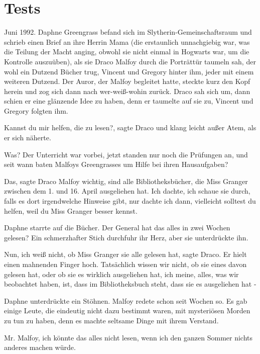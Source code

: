 \chapter{Tests}

Juni 1992. Daphne Greengrass befand sich im Slytherin-Gemeinschaftsraum und
schrieb einen Brief an ihre Herrin Mama (die erstaunlich unnachgiebig war, was
die Teilung der Macht anging, obwohl sie nicht einmal in Hogwarts war, um die
Kontrolle auszuüben), als sie Draco Malfoy durch die Porträttür taumeln sah, der
wohl ein Dutzend Bücher trug, Vincent und Gregory hinter ihm, jeder mit einem
weiteren Dutzend. Der Auror, der Malfoy begleitet hatte, steckte kurz den Kopf
herein und zog sich dann nach wer-weiß-wohin zurück. Draco sah sich um, dann
schien er eine glänzende Idee zu haben, denn er taumelte auf sie zu, Vincent und
Gregory folgten ihm.

\glqq{}Kannst du mir helfen, die zu lesen?\grqq{}, sagte Draco und klang leicht
außer Atem, als er sich näherte.

\glqq{}Was?\grqq{} Der Unterricht war vorbei, jetzt standen nur noch die
Prüfungen an, und seit wann baten Malfoys Greengrasses um Hilfe bei ihren
Hausaufgaben?

\glqq{}Das\grqq{}, sagte Draco Malfoy wichtig, \glqq{}sind alle Bibliotheksbücher,
die Miss Granger zwischen dem 1. und 16. April ausgeliehen hat. Ich dachte, ich
schaue sie durch, falls es dort irgendwelche Hinweise gibt, nur dachte ich dann,
vielleicht solltest du helfen, weil du Miss Granger besser kennst.\grqq{}

Daphne starrte auf die Bücher. \glqq{}Der General hat das alles in zwei Wochen
gelesen?\grqq{} Ein schmerzhafter Stich durchfuhr ihr Herz, aber sie
unterdrückte ihn.

\glqq{}Nun, ich weiß nicht, ob Miss Granger sie alle gelesen hat\grqq{}, sagte
Draco. Er hielt einen mahnenden Finger hoch. \glqq{}Tatsächlich wissen wir nicht,
ob sie eines davon gelesen hat, oder ob sie es wirklich ausgeliehen hat, ich
meine, alles, was wir beobachtet haben, ist, dass im Bibliotheksbuch steht, dass
sie es ausgeliehen hat -\grqq{}

Daphne unterdrückte ein Stöhnen. Malfoy redete schon seit Wochen so. Es gab
einige Leute, die eindeutig nicht dazu bestimmt waren, mit mysteriösen Morden zu
tun zu haben, denn es machte seltsame Dinge mit ihrem Verstand.

\glqq{}Mr. Malfoy, ich könnte das alles nicht lesen, wenn ich den ganzen Sommer
nichts anderes machen würde.\grqq{}

